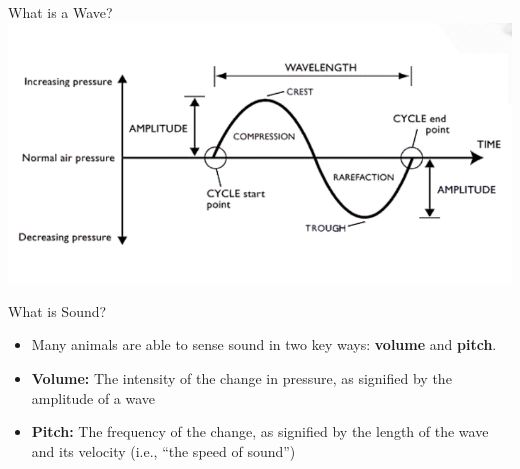 \begin{frame}{What is a Wave?}
	\includegraphics[width=\linewidth,height=0.8\textheight,keepaspectratio]{wave_desc}
\end{frame}

\begin{frame}{What is Sound?}
	\begin{itemize}
		\item Many animals are able to sense sound in two key ways:
		\textbf{volume} and \textbf{pitch}.
		\item\textbf{Volume:} The intensity of the change in pressure, as signified by the
		amplitude of a wave
		\item\textbf{Pitch:} The frequency of the change, as signified by the length of
		the wave and its velocity (i.e., “the speed of sound”)
	\end{itemize}
\end{frame}